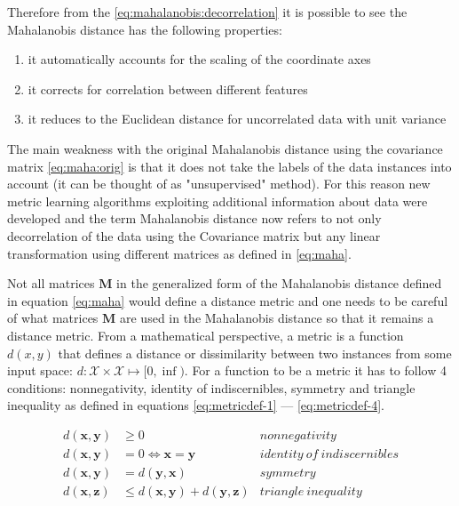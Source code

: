 \documentclass[12pt,a4paper]{report}
\begin{document}
Therefore from the \ref{eq:mahalanobis:decorrelation} it is possible to see the Mahalanobis distance has the following properties:
\begin{enumerate}
\item it automatically accounts for the scaling of the coordinate axes
\item it corrects for correlation between different features
\item it reduces to the Euclidean distance for uncorrelated data with unit variance
\end{enumerate}

The main weakness with the original Mahalanobis distance using the covariance matrix \ref{eq:maha:orig} is that it does not take the labels of the data instances into account (it can be thought of as "unsupervised" method). For this reason new metric learning algorithms exploiting additional information about data were developed and the term Mahalanobis distance now refers to not only decorrelation of the data using the Covariance matrix but any linear transformation using different matrices as defined in \ref{eq:maha}.

Not all matrices $\bm{M}$ in the generalized form of the Mahalanobis distance defined in equation \ref{eq:maha} would define a distance metric and one needs to be careful of what matrices $\bm{M}$ are used in the Mahalanobis distance so that it remains a distance metric. From a mathematical perspective, a metric is a function $d(x,y)$ that defines a distance or dissimilarity between two instances from some input space: $d:\mathcal{X} \times \mathcal{X} \mapsto [0,\inf)$. For a function to be a metric it has to follow 4 conditions: nonnegativity, identity of indiscernibles, symmetry and triangle inequality as defined in equations \ref{eq:metricdef-1} --- \ref{eq:metricdef-4}.

\begin{align}
d(\textbf{x},\textbf{y}) &\geq 0 & nonnegativity \label{eq:metricdef-1} \\
d(\textbf{x},\textbf{y}) &= 0 \iff \textbf{x}=\textbf{y} & identity \ of \ indiscernibles \label{eq:metricdef-2} \\
d(\textbf{x},\textbf{y}) &= d(\textbf{y},\textbf{x}) & symmetry \label{eq:metricdef-3} \\
d(\textbf{x},\textbf{z}) &\leq d(\textbf{x},\textbf{y}) + d(\textbf{y},\textbf{z}) & triangle \ inequality \label{eq:metricdef-4}
\end{align} 
\end{document}
